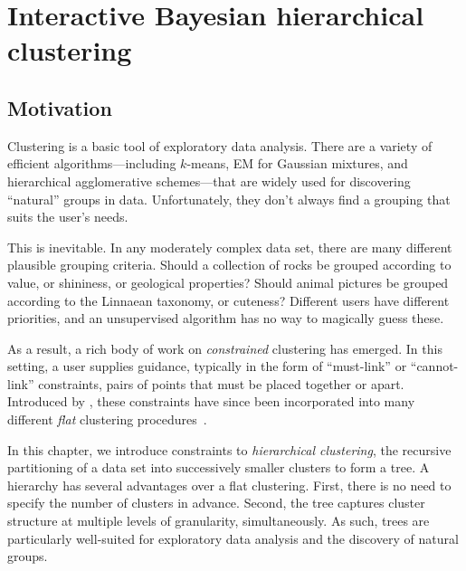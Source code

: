 \chapter{Interactive Bayesian hierarchical clustering}
\label{chap:ibhc}

\section{Motivation}
Clustering is a basic tool of exploratory data analysis. There are a variety of efficient algorithms---including $k$-means, EM for Gaussian mixtures, and hierarchical agglomerative schemes---that are widely used for discovering ``natural'' groups in data. Unfortunately, they don't always find a grouping that suits the user's needs.

This is inevitable. In any moderately complex data set, there are many different plausible grouping criteria. Should a collection of rocks be grouped according to value, or shininess, or geological properties? Should animal pictures be grouped according to the Linnaean taxonomy, or cuteness? Different users have different priorities, and an unsupervised algorithm has no way to magically guess these.

As a result, a rich body of work on {\it constrained} clustering has emerged.
In this setting, a user supplies guidance, typically in the form of ``must-link'' or ``cannot-link'' constraints, pairs of points that must be placed together or apart. Introduced by \citet{WagstaffConstrainedKnowledge}, these constraints have since been incorporated into many different {\it flat} clustering procedures~\citep{Wagstaff2000ClusteringConstraints,Bansal2004CorrelationClustering,Basu2004,Kulis2009Semi-supervisedApproach,BiswasActiveHumans}.

In this chapter, we introduce constraints to {\it hierarchical clustering}, the recursive partitioning of a data set into successively smaller clusters to form a tree. A hierarchy has several advantages over a flat clustering. First, there is no need to specify the number of clusters in advance. Second, the tree captures cluster structure at multiple levels of granularity, simultaneously. As such, trees are particularly well-suited for exploratory data analysis and the discovery of natural groups.

